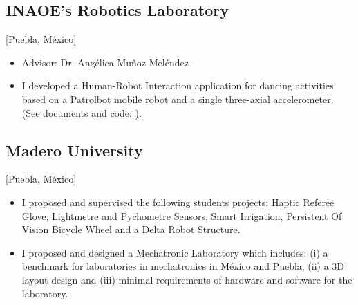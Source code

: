 \documentclass{mycv}
\begin{document}
\subsection{INAOE's Robotics Laboratory}[Puebla, M\'exico]
\vspace{1mm}
\begin{positions}
\end{positions}
\begin{itemize}
  \item Advisor: Dr. Ang\'elica Mu\~noz Mel\'endez
  \item I developed a Human-Robot Interaction application for dancing activities based on 
a Patrolbot mobile robot and a single three-axial accelerometer. 
\href{https://sites.google.com/site/perezxochicale/projects/a-human-robot-interaction-dance-demo-tmr2013}{(See documents and code: \faExternalLink*)}.
\end{itemize}

\subsection{Madero University}[Puebla, M\'exico]
\vspace{1mm}
\begin{positions}
\end{positions}
\begin{itemize}
	\item I proposed and supervised the following students projects: Haptic Referee Glove,
	Lightmetre and Pychometre Sensors, Smart Irrigation, Persistent Of Vision Bicycle Wheel
	and a Delta Robot Structure.
	\item I proposed and designed a Mechatronic Laboratory which includes: 
	(i) a benchmark for laboratories in mechatronics in M\'exico and Puebla, 
	(ii) a 3D layout design and 
	(iii) minimal requirements of hardware and software for the laboratory.
\end{itemize}

\end{document}
